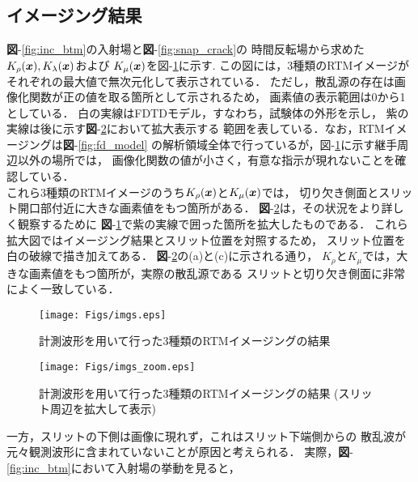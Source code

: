 \subsection{イメージング結果}
{\bf 図}-\ref{fig:inc_btm}の入射場と{\bf 図}-\ref{fig:snap_crack}の
時間反転場から求めた$K_\rho(\boldsymbol{x}),K_{\lambda}(\boldsymbol{x})$および
$K_{\mu}(\boldsymbol{x})$を{図-}\ref{fig:imgs}に示す. 
この図には，3種類のRTMイメージがそれぞれの最大値で無次元化して表示されている．
ただし，散乱源の存在は画像化関数が正の値を取る箇所として示されるため，
画素値の表示範囲は0から1としている．
白の実線はFDTDモデル，すなわち，試験体の外形を示し，
紫の実線は後に示す{\bf 図}-\ref{fig:imgs_zoom}において拡大表示する
範囲を表している．なお，RTMイメージングは{\bf 図}-\ref{fig:fd_model}
の解析領域全体で行っているが，{図-}\ref{fig:imgs}に示す継手周辺以外の場所では，
画像化関数の値が小さく，有意な指示が現れないことを確認している．
\\
\hspace{\parindent}
これら3種類のRTMイメージのうち$K_\rho(\boldsymbol{x})$と$K_{\mu}(\boldsymbol{x})$では，
切り欠き側面とスリット開口部付近に大きな画素値をもつ箇所がある．
{\bf 図}-\ref{fig:imgs_zoom}は，その状況をより詳しく観察するために
{\bf 図}-\ref{fig:imgs}で紫の実線で囲った箇所を拡大したものである．
これら拡大図ではイメージング結果とスリット位置を対照するため，
スリット位置を白の破線で描き加えてある．
{\bf 図}-\ref{fig:imgs_zoom}の(a)と(c)に示される通り，
$K_\rho$と$K_\mu$では，大きな画素値をもつ箇所が，実際の散乱源である
スリットと切り欠き側面に非常によく一致している．
\begin{figure}[tbh]
\centering
	\texttt{[image: Figs/imgs.eps]}
	\caption{計測波形を用いて行った3種類のRTMイメージングの結果}
	\label{fig:imgs}
	\vspace{-3mm}
\end{figure}
\begin{figure}[tbh]
\centering
	\texttt{[image: Figs/imgs\_zoom.eps]}
	\caption{計測波形を用いて行った3種類のRTMイメージングの結果
	(スリット周辺を拡大して表示)}
	\label{fig:imgs_zoom}
	\vspace{-5mm}
\end{figure}
一方，スリットの下側は画像に現れず，これはスリット下端側からの
散乱波が元々観測波形に含まれていないことが原因と考えられる．
実際，{\bf 図}-\ref{fig:inc_btm}において入射場の挙動を見ると，

